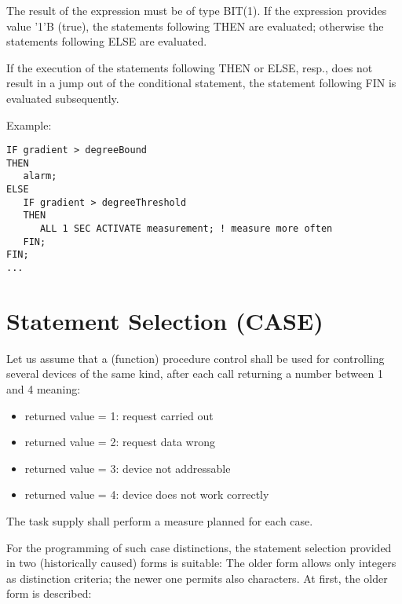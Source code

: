 \begin{grammarframe}

\end{grammarframe}

The result of the expression must be of type BIT(1). If the expression
provides value '1'B (true), the statements following THEN are evaluated;
otherwise the statements following ELSE are evaluated.

If the execution of the statements following THEN or ELSE, resp., does
not result in a jump out of the conditional statement, the statement
following FIN is evaluated subsequently.

Example:

\begin{lstlisting}
IF gradient > degreeBound
THEN
   alarm;
ELSE
   IF gradient > degreeThreshold 
   THEN 
      ALL 1 SEC ACTIVATE measurement; ! measure more often
   FIN;
FIN;
...
\end{lstlisting}

\section{Statement Selection (CASE)}  %
\label{sec_case}

Let us assume that a (function) procedure control shall be used for
controlling several devices of the same kind, after each call returning
a number between 1 and 4 meaning:
\begin{itemize}
\item returned value = 1: request carried out
\item returned value = 2: request data wrong
\item returned value = 3: device not addressable
\item returned value = 4: device does not work correctly
\end{itemize}

The task supply shall perform a measure planned for each case.

For the programming of such case distinctions, the statement selection
provided in two (historically caused) forms is suitable: The older form
allows only integers as distinction criteria; the newer one permits also
characters. At first, the older form is described:

\begin{grammarframe}


\end{grammarframe}

